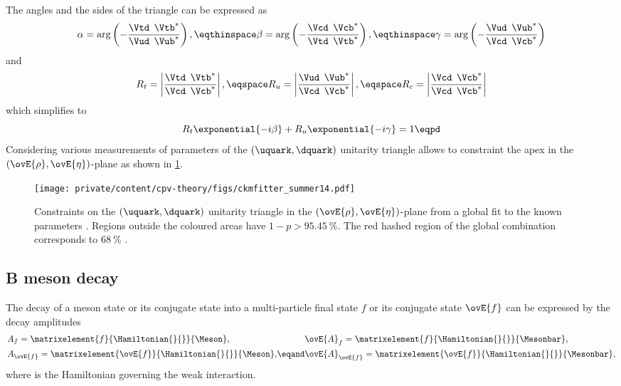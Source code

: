 The angles and the sides of the triangle can be expressed as
%
\begin{equation}
  \alpha = \arg\left(-\frac{\Vtd^{\phantom{\ast}}\Vtb^{\ast}}{\Vud^{\phantom{\ast}}\Vub^{\ast}}\right),\eqthinspace 
  \beta =  \arg\left(-\frac{\Vcd^{\phantom{\ast}}\Vcb^{\ast}}{\Vtd^{\phantom{\ast}}\Vtb^{\ast}}\right),\eqthinspace 
  \gamma = \arg\left(-\frac{\Vud^{\phantom{\ast}}\Vub^{\ast}}{\Vcd^{\phantom{\ast}}\Vcb^{\ast}}\right)
\end{equation}
%
and
%
\begin{equation}
  R_t = \left| \frac{\Vtd^{\phantom{\ast}}\Vtb^{\ast}}{\Vcd^{\phantom{\ast}}\Vcb^{\ast}} \right|,\eqspace
  R_u = \left| \frac{\Vud^{\phantom{\ast}}\Vub^{\ast}}{\Vcd^{\phantom{\ast}}\Vcb^{\ast}} \right|,\eqspace
  R_c = \left| \frac{\Vcd^{\phantom{\ast}}\Vcb^{\ast}}{\Vcd^{\phantom{\ast}}\Vcb^{\ast}} \right|
\end{equation}
%
which simplifies to
%
\begin{equation}
  R_t \exponential{-i\beta} + R_u \exponential{-i\gamma} = 1 \eqpd
\end{equation}
%
Considering various measurements of parameters of the ${(\uquark,\dquark)}$
unitarity triangle allows to constraint the apex in the
${(\ovE{\rho},\ovE{\eta})}$-plane \cite{Charles:2004jd,Bona:2006ah} as shown in
\cref{fig:cpv_theory:flavour_physics:ckm_matrix:ckm_fitter_14}.

\begin{figure}[ht]
\centering
\texttt{[image: private/content/cpv-theory/figs/ckmfitter\_summer14.pdf]}
\caption{Constraints on the ${(\uquark,\dquark)}$ unitarity triangle in the
${(\ovE{\rho},\ovE{\eta})}$-plane from a global fit to the known \CKM parameters
\cite{Charles:2004jd}. Regions outside the coloured areas have $1-p >
\SI{95.45}{\percent}$. The red hashed region of the global combination
corresponds to $\SI{68}{\percent}$ \CL.}
\label{fig:cpv_theory:flavour_physics:ckm_matrix:ckm_fitter_14}
\end{figure}

\subsection{B meson decay}
\label{sec:cpv_theory:flavour_physics:bdecays}

The decay of a meson state \Meson or its \CP conjugate state \Mesonbar into a
multi-particle final state $f$ or its \CP conjugate state $\ovE{f}$ can be
expressed by the decay amplitudes
%
\begin{equation}
  \begin{alignedat}{2}
    & A_f         = \matrixelement{f}{\Hamiltonian{}{}}{\Meson},       && \ovE{A}_f         = \matrixelement{f}{\Hamiltonian{}{}}{\Mesonbar}, \\
    & A_{\ovE{f}} = \matrixelement{\ovE{f}}{\Hamiltonian{}{}}{\Meson}, &\eqand& \ovE{A}_{\ovE{f}} = \matrixelement{\ovE{f}}{\Hamiltonian{}{}}{\Mesonbar},
  \end{alignedat}
\end{equation}
%
where \Hamiltonian{}{} is the Hamiltonian governing the weak interaction. 

